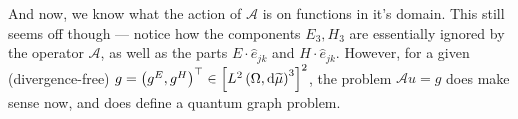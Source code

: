 \documentclass[11pt]{report}
\newcommand{\aop}{\mathcal{A}}
\begin{document}
And now, we know what the action of $\aop$ is on functions in it's domain.
This still seems off though --- notice how the components $E_3,H_3$ are essentially ignored by the operator $\aop$, as well as the parts $E\cdot\hat{e}_{jk}$ and $H\cdot\hat{e}_{jk}$.
However, for a given (divergence-free) $g=\left( g^E,g^H \right)^\top\in\left[ L^{2}\left( \Omega,\mathrm{d}\widetilde{\mu} \right)^3 \right]^2$, the problem $\aop u = g$ does make sense now, and does define a quantum graph problem.
\end{document}
